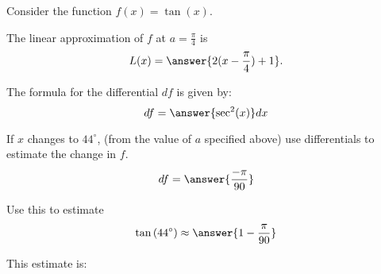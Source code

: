 \documentclass{ximera}
\author{Bobby Ramsey}
\begin{document}
\begin{exercise}

	Consider the function $f(x) = \tan(x)$.

	The linear approximation of $f$ at $a=\frac{\pi}{4}$ is 
	\[ L(x) = \answer{2(x-\frac{\pi}{4})+1}. \]

	\begin{exercise}
		The formula for the differential $df$ is given by:
		\[ df = \answer{\sec^2(x)} dx \]					
		
		\begin{exercise}
			If $x$ changes to $44^\circ$, (from the value of $a$ specified above) use differentials to estimate the change in $f$.
			\[ df = \answer{\frac{-\pi}{90}} \]
			
			\begin{exercise}
				Use this to estimate \[\tan\left( 44^\circ \right) \approx \answer{1-\frac{\pi}{90}} \]
				
				\begin{exercise}
					This estimate is:
					\begin{multipleChoice}
					\end{multipleChoice}
				\end{exercise}
			\end{exercise}
		\end{exercise}
	\end{exercise}
\end{exercise}
\end{document}
